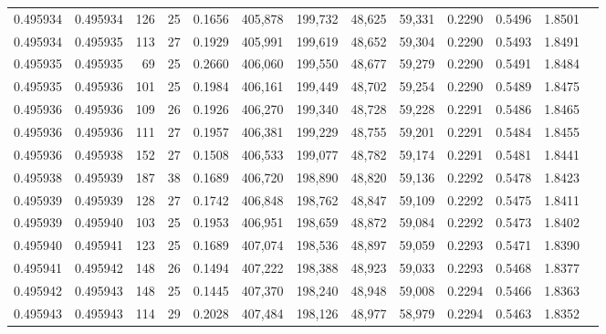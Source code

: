 \begin{tabular}{rrrrrrrrrrrrr}
0.495934 & 0.495934 & 126 &  25 &                                     0.1656 & 405,878 & 199,732 &  48,625 &  59,331 & 0.2290 & 0.5496 & 1.8501 \\
0.495934 & 0.495935 & 113 &  27 &                                     0.1929 & 405,991 & 199,619 &  48,652 &  59,304 & 0.2290 & 0.5493 & 1.8491 \\
0.495935 & 0.495935 &  69 &  25 &                                     0.2660 & 406,060 & 199,550 &  48,677 &  59,279 & 0.2290 & 0.5491 & 1.8484 \\
0.495935 & 0.495936 & 101 &  25 &                                     0.1984 & 406,161 & 199,449 &  48,702 &  59,254 & 0.2290 & 0.5489 & 1.8475 \\
0.495936 & 0.495936 & 109 &  26 &                                     0.1926 & 406,270 & 199,340 &  48,728 &  59,228 & 0.2291 & 0.5486 & 1.8465 \\
0.495936 & 0.495936 & 111 &  27 &                                     0.1957 & 406,381 & 199,229 &  48,755 &  59,201 & 0.2291 & 0.5484 & 1.8455 \\
0.495936 & 0.495938 & 152 &  27 &                                     0.1508 & 406,533 & 199,077 &  48,782 &  59,174 & 0.2291 & 0.5481 & 1.8441 \\
0.495938 & 0.495939 & 187 &  38 &                                     0.1689 & 406,720 & 198,890 &  48,820 &  59,136 & 0.2292 & 0.5478 & 1.8423 \\
0.495939 & 0.495939 & 128 &  27 &                                     0.1742 & 406,848 & 198,762 &  48,847 &  59,109 & 0.2292 & 0.5475 & 1.8411 \\
0.495939 & 0.495940 & 103 &  25 &                                     0.1953 & 406,951 & 198,659 &  48,872 &  59,084 & 0.2292 & 0.5473 & 1.8402 \\
0.495940 & 0.495941 & 123 &  25 &                                     0.1689 & 407,074 & 198,536 &  48,897 &  59,059 & 0.2293 & 0.5471 & 1.8390 \\
0.495941 & 0.495942 & 148 &  26 &                                     0.1494 & 407,222 & 198,388 &  48,923 &  59,033 & 0.2293 & 0.5468 & 1.8377 \\
0.495942 & 0.495943 & 148 &  25 &                                     0.1445 & 407,370 & 198,240 &  48,948 &  59,008 & 0.2294 & 0.5466 & 1.8363 \\
0.495943 & 0.495943 & 114 &  29 &                                     0.2028 & 407,484 & 198,126 &  48,977 &  58,979 & 0.2294 & 0.5463 & 1.8352 \\

\end{tabular}
